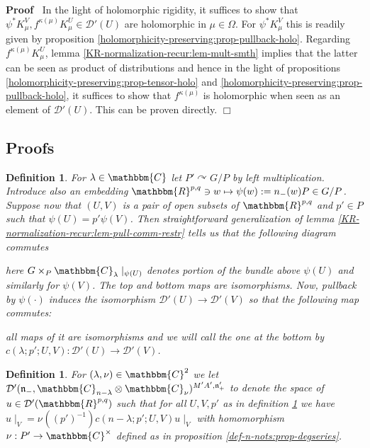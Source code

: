 \documentclass{article}
\newcommand{\assign}{:=}
\renewenvironment{proof}{\noindent\textbf{Proof\ }}{\hspace*{\fill}$\Box$\medskip}
\newtheorem{definition}[proposition]{Definition}
\theoremstyle{remark}
\newcommand{\C}{\ensuremath{\mathbbm{C}}}
\begin{document}
\begin{proof}
  In the light of holomorphic rigidity, it suffices to show that $\psi^{\ast}
  K^V_{\mu}, f^{\kappa (\mu)} K^U_{\mu} \in \mathcal{D}' (U)$ are holomorphic
  in $\mu \in \Omega$. For $\psi^{\ast} K_{\mu}^V$ this is readily given by
  proposition \ref{holomorphicity-preserving:prop-pullback-holo}. Regarding
  $f^{\kappa (\mu)} K^U_{\mu}$, lemma
  \ref{KR-normalization-recur:lem-mult-smth} implies that the latter can be
  seen as product of distributions and hence in the light of propositions
  \ref{holomorphicity-preserving:prop-tensor-holo} and
  \ref{holomorphicity-preserving:prop-pullback-holo}, it suffices to show that
  $f^{\kappa (\mu)}$ is holomorphic when seen as an element of $\mathcal{D}'
  (U)$. This can be proven directly.
\end{proof}

\subsection{Proofs}

\begin{definition}
  \label{sol:def-localaciton}For $\lambda \in \mathbbm{C}$ let $P'
  \curvearrowright G / P$ by left multiplication. Introduce also an embedding
  $\mathbbm{R}^{p, q} \ni w \mapsto \psi (w) \assign n_- (w) P \in G / P$.
  Suppose now that $(U, V)$ is a pair of open subsets of $\mathbbm{R}^{p, q}$
  and $p' \in P$ such that $\psi (U) = p' \psi (V)$. Then straightforward
  generalization of lemma \ref{KR-normalization-recur:lem-pull-comm-restr}
  tells us that the following diagram commutes
  \centerline{ }
  here $G \times_P \mathbbm{C}_{\lambda} \mid_{\psi (U)}$ denotes portion
  of the bundle above $\psi (U)$ and similarly for $\psi (V)$. The top and
  bottom maps are isomorphisms. Now, pullback by $\psi (\cdot)$ induces the
  isomorphism $\mathcal{D}' (U) \rightarrow \mathcal{D}' (V)$ so that the
  following map commutes:
  
  \centerline{ }
  
  all maps of it are isomorphisms and we will call the one at the bottom by $c
  (\lambda ; p' ; U, V) : \mathcal{D}' (U) \rightarrow \mathcal{D}' (V)$.
\end{definition}

\begin{definition}
  \label{sol:def-D'n}For $(\lambda, \nu) \in \mathbbm{C}^2$ we let
  $\mathcal{D}' (\mathfrak{n}_-, \mathbbm{C}_{n - \lambda} \otimes
  \mathbbm{C}_{\nu})^{M' A', \mathfrak{n}'_+}$ to denote the space of $u \in
  \mathcal{D}' (\mathbbm{R}^{p, q})$ such that for all $U, V, p'$ as in
  definition \ref{sol:def-localaciton} we have $u \mid_V = \nu^{} ((p')^{-
  1}) c (n - \lambda ; p' ; U, V) u \mid_V$ with homomorphism $\nu : P'
  \rightarrow \mathbbm{C}^{\times}$ defined as in proposition
  \ref{def-n-nots:prop-degseries}.
\end{definition}
\end{document}
